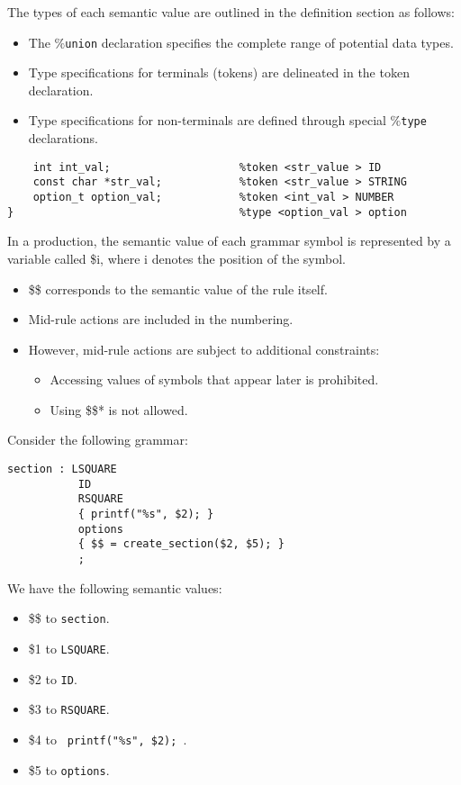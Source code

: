 The types of each semantic value are outlined in the definition section as follows:
\begin{itemize}
    \item The \texttt{$\%$union} declaration specifies the complete range of potential data types.
    \item Type specifications for terminals (tokens) are delineated in the token declaration.
    \item Type specifications for non-terminals are defined through special \texttt{$\%$type} declarations.
\end{itemize}
\begin{example}
    \begin{lstlisting}[style=C]
%union {
    int int_val;                    %token <str_value > ID
    const char *str_val;            %token <str_value > STRING
    option_t option_val;            %token <int_val > NUMBER
}                                   %type <option_val > option
    \end{lstlisting}
\end{example}
In a production, the semantic value of each grammar symbol is represented by a variable called \$i, where i denotes the position of the symbol.
\begin{itemize}
    \item \$\$ corresponds to the semantic value of the rule itself. 
    \item Mid-rule actions are included in the numbering.
    \item However, mid-rule actions are subject to additional constraints:
        \begin{itemize}
            \item Accessing values of symbols that appear later is prohibited.
            \item Using \$\$* is not allowed.
        \end{itemize}
\end{itemize}
\begin{example}
    Consider the following grammar: 
    \begin{lstlisting}[style=C]
section : LSQUARE
           ID
           RSQUARE
           { printf("%s", $2); }
           options
           { $$ = create_section($2, $5); }
           ;
    \end{lstlisting}
    We have the following semantic values: 
    \begin{itemize}
        \item \$\$ to \texttt{section}. 
        \item \$1 to \texttt{LSQUARE}. 
        \item \$2 to \texttt{ID}. 
        \item \$3 to \texttt{RSQUARE}. 
        \item \$4 to \texttt{{ printf("\%s", \$2); }}. 
        \item \$5 to \texttt{options}. 
    \end{itemize}
\end{example}
